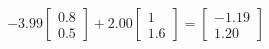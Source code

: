 \documentclass[preview]{standalone}
\begin{document}
\begin{align*}
-3.99 \begin{bmatrix} 0.8 \\ 0.5 \end{bmatrix} + 2.00 \begin{bmatrix} 1 \\ 1.6 \end{bmatrix} = \begin{bmatrix} -1.19 \\ 1.20 \end{bmatrix}
\end{align*}
\end{document}
